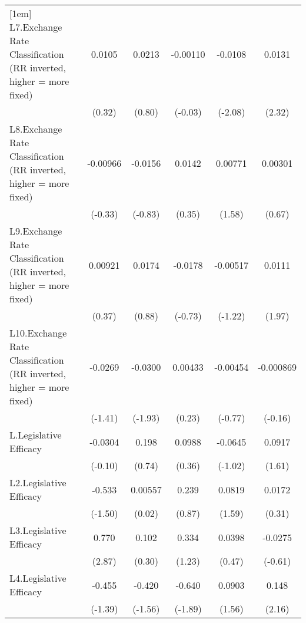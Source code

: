 {\begin{tabular}{l*{5}{c}}
[1em]
L7.Exchange Rate Classification (RR inverted, higher = more fixed)&   0.0105         &   0.0213         & -0.00110         &  -0.0108\sym{*}  &   0.0131\sym{*}  \\
                &   (0.32)         &   (0.80)         &  (-0.03)         &  (-2.08)         &   (2.32)         \\
[1em]
L8.Exchange Rate Classification (RR inverted, higher = more fixed)& -0.00966         &  -0.0156         &   0.0142         &  0.00771         &  0.00301         \\
                &  (-0.33)         &  (-0.83)         &   (0.35)         &   (1.58)         &   (0.67)         \\
[1em]
L9.Exchange Rate Classification (RR inverted, higher = more fixed)&  0.00921         &   0.0174         &  -0.0178         & -0.00517         &   0.0111         \\
                &   (0.37)         &   (0.88)         &  (-0.73)         &  (-1.22)         &   (1.97)         \\
[1em]
L10.Exchange Rate Classification (RR inverted, higher = more fixed)&  -0.0269         &  -0.0300         &  0.00433         & -0.00454         &-0.000869         \\
                &  (-1.41)         &  (-1.93)         &   (0.23)         &  (-0.77)         &  (-0.16)         \\
[1em]
L.Legislative Efficacy&  -0.0304         &    0.198         &   0.0988         &  -0.0645         &   0.0917         \\
                &  (-0.10)         &   (0.74)         &   (0.36)         &  (-1.02)         &   (1.61)         \\
[1em]
L2.Legislative Efficacy&   -0.533         &  0.00557         &    0.239         &   0.0819         &   0.0172         \\
                &  (-1.50)         &   (0.02)         &   (0.87)         &   (1.59)         &   (0.31)         \\
[1em]
L3.Legislative Efficacy&    0.770\sym{**} &    0.102         &    0.334         &   0.0398         &  -0.0275         \\
                &   (2.87)         &   (0.30)         &   (1.23)         &   (0.47)         &  (-0.61)         \\
[1em]
L4.Legislative Efficacy&   -0.455         &   -0.420         &   -0.640         &   0.0903         &    0.148\sym{*}  \\
                &  (-1.39)         &  (-1.56)         &  (-1.89)         &   (1.56)         &   (2.16)         \\

\end{tabular}}
